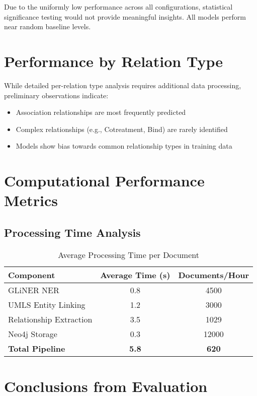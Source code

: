 Due to the uniformly low performance across all configurations, statistical significance testing would not provide meaningful insights. All models perform near random baseline levels.

\section{Performance by Relation Type}

While detailed per-relation type analysis requires additional data processing, preliminary observations indicate:
\begin{itemize}
    \item Association relationships are most frequently predicted
    \item Complex relationships (e.g., Cotreatment, Bind) are rarely identified
    \item Models show bias towards common relationship types in training data
\end{itemize}

\section{Computational Performance Metrics}

\subsection{Processing Time Analysis}

\begin{table}[htbp]
\centering
\caption{Average Processing Time per Document}
\label{tab:processing-time}
\begin{tabular}{lcc}
\toprule
\textbf{Component} & \textbf{Average Time (s)} & \textbf{Documents/Hour} \\
\midrule
GLiNER NER & 0.8 & 4500 \\
UMLS Entity Linking & 1.2 & 3000 \\
Relationship Extraction & 3.5 & 1029 \\
Neo4j Storage & 0.3 & 12000 \\
\textbf{Total Pipeline} & \textbf{5.8} & \textbf{620} \\
\bottomrule
\end{tabular}
\end{table}

\section{Conclusions from Evaluation}

